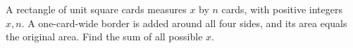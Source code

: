 A rectangle of unit square cards measures $x$ by $n$ cards, with positive integers $x,n$. A one-card-wide border is added around all four sides, and its area equals the original area. Find the sum of all possible $x$.
